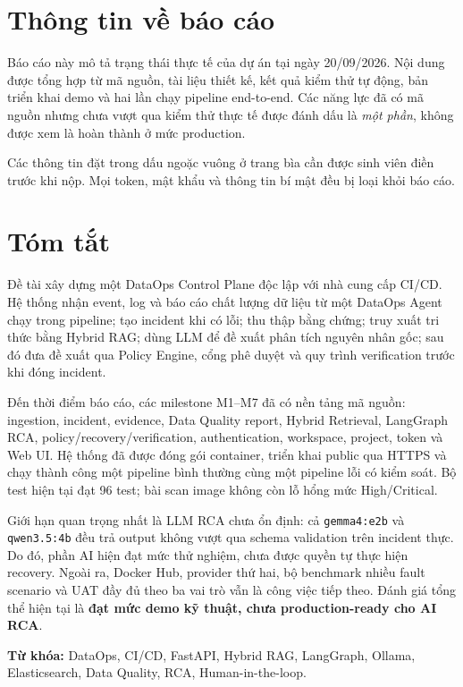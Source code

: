 \documentclass[12pt,a4paper,oneside]{report}
\newcommand{\code}[1]{\texttt{#1}}
\begin{document}
\chapter*{Thông tin về báo cáo}

Báo cáo này mô tả trạng thái thực tế của dự án tại ngày 20/09/2026. Nội dung được tổng hợp
từ mã nguồn, tài liệu thiết kế, kết quả kiểm thử tự động, bản triển khai demo và hai lần chạy
pipeline end-to-end. Các năng lực đã có mã nguồn nhưng chưa vượt qua kiểm thử thực tế được đánh
dấu là \emph{một phần}, không được xem là hoàn thành ở mức production.

Các thông tin đặt trong dấu ngoặc vuông ở trang bìa cần được sinh viên điền trước khi nộp.
Mọi token, mật khẩu và thông tin bí mật đều bị loại khỏi báo cáo.

\chapter*{Tóm tắt}

Đề tài xây dựng một DataOps Control Plane độc lập với nhà cung cấp CI/CD. Hệ thống nhận event,
log và báo cáo chất lượng dữ liệu từ một DataOps Agent chạy trong pipeline; tạo incident khi có
lỗi; thu thập bằng chứng; truy xuất tri thức bằng Hybrid RAG; dùng LLM để đề xuất phân tích nguyên
nhân gốc; sau đó đưa đề xuất qua Policy Engine, cổng phê duyệt và quy trình verification trước khi
đóng incident.

Đến thời điểm báo cáo, các milestone M1--M7 đã có nền tảng mã nguồn: ingestion, incident,
evidence, Data Quality report, Hybrid Retrieval, LangGraph RCA, policy/recovery/verification,
authentication, workspace, project, token và Web UI. Hệ thống đã được đóng gói container, triển
khai public qua HTTPS và chạy thành công một pipeline bình thường cùng một pipeline lỗi có kiểm
soát. Bộ test hiện tại đạt 96 test; bài scan image không còn lỗ hổng mức High/Critical.

Giới hạn quan trọng nhất là LLM RCA chưa ổn định: cả \code{gemma4:e2b} và
\code{qwen3.5:4b} đều trả output không vượt qua schema validation trên incident thực. Do đó,
phần AI hiện đạt mức thử nghiệm, chưa được quyền tự thực hiện recovery. Ngoài ra, Docker Hub,
provider thứ hai, bộ benchmark nhiều fault scenario và UAT đầy đủ theo ba vai trò vẫn là công
việc tiếp theo. Đánh giá tổng thể hiện tại là \textbf{đạt mức demo kỹ thuật, chưa production-ready
cho AI RCA}.

\vspace{0.5em}
\noindent\textbf{Từ khóa:} DataOps, CI/CD, FastAPI, Hybrid RAG, LangGraph, Ollama,
Elasticsearch, Data Quality, RCA, Human-in-the-loop.
\end{document}
